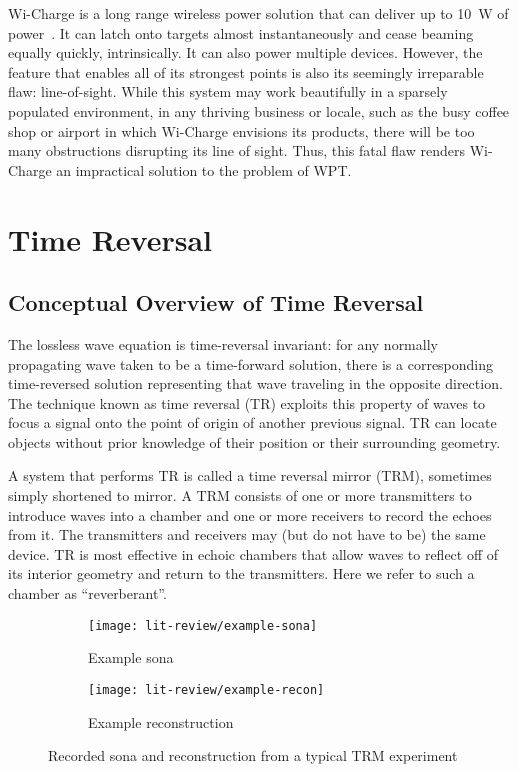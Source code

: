 Wi-Charge is a long range wireless power solution that can deliver up to 10~W of power~\cite{wicharge2016}. It can latch onto targets almost instantaneously and cease beaming equally quickly, intrinsically. It can also power multiple devices. However, the feature that enables all of its strongest points is also its seemingly irreparable flaw: line-of-sight. While this system may work beautifully in a sparsely populated environment, in any thriving business or locale, such as the busy coffee shop or airport in which Wi-Charge envisions its products, there will be too many obstructions disrupting its line of sight. Thus, this fatal flaw renders Wi-Charge an impractical solution to the problem of WPT.

\section{Time Reversal}
\label{lit-review-tr}

\subsection{Conceptual Overview of Time Reversal}

The lossless wave equation is time-reversal invariant: for any normally propagating wave taken to be a time-forward solution, there is a corresponding time-reversed solution representing that wave traveling in the opposite direction. The technique known as time reversal (TR) exploits this property of waves to focus a signal onto the point of origin of another previous signal. TR can locate objects without prior knowledge of their position or their surrounding geometry.

A system that performs TR is called a time reversal mirror (TRM), sometimes simply shortened to mirror. A TRM consists of one or more transmitters to introduce waves into a chamber and one or more receivers to record the echoes from it. The transmitters and receivers may (but do not have to be) the same device. TR is most effective in echoic chambers that allow waves to reflect off of its interior geometry and return to the transmitters. Here we refer to such a chamber as ``reverberant''.

\begin{figure}[h!]
    \centering
    \begin{subfigure}{.45\textwidth}
        \centering
        \texttt{[image: lit-review/example-sona]}
        \caption[Example sona]{Example sona}
         \label{fig:lit-review-example-sona}
    \end{subfigure}
    \begin{subfigure}{.45\textwidth}
        \centering
        \texttt{[image: lit-review/example-recon]}
        \caption[Example reconstruction]{Example reconstruction}
         \label{fig:lit-review-example-recon}
    \end{subfigure}
    \caption{Recorded sona and reconstruction from a typical TRM experiment}
    \label{fig:lit-review-example}
\end{figure}

